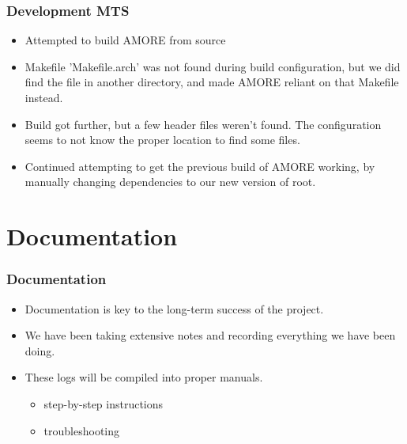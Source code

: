 \documentclass[aspectratio=169]{beamer}
\begin{document}
\begin{frame}

  \frametitle{Development MTS}

  \begin{itemize}
    \item Attempted to build AMORE from source
    \item Makefile 'Makefile.arch' was not found during build configuration, but
      we did find the file in another directory, and made AMORE reliant on that
      Makefile instead.
    \item Build got further, but a few header files weren't found. The
      configuration seems to not know the proper location to find some files.
    \item Continued attempting to get the previous build of AMORE working, by
    	  manually changing dependencies to our new version of root.
  \end{itemize}

\end{frame}



\section{Documentation}

\begin{frame}

  \frametitle{Documentation}

  \begin{itemize}
  \item Documentation is key to the long-term success of the project.
  \item We have been taking extensive notes and recording everything we have
    been doing.
  \item These logs will be compiled into proper manuals.
    \begin{itemize}
    \item step-by-step instructions
    \item troubleshooting
    \end{itemize}
  \end{itemize}


\end{frame}


\end{document}

